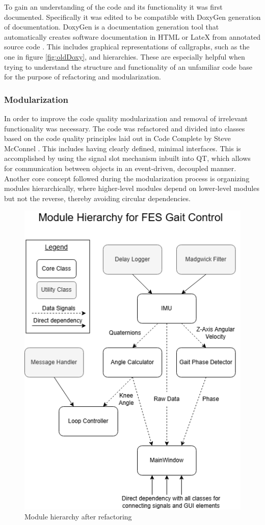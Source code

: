 To gain an understanding of the code and its functionality it was first documented. Specifically it was edited to be compatible with DoxyGen generation of documentation. DoxyGen is a documentation generation tool that automatically creates software documentation in HTML or LateX from annotated source code . This includes graphical representations of callgraphs, such as the one in figure \ref{fig:oldDoxy}, and hierarchies. These are especially helpful when trying to understand the structure and functionality of an unfamiliar code base for the purpose of refactoring and modularization.  


\subsubsection{Modularization}

In order to improve the code quality modularization and removal of irrelevant functionality was necessary. The code was refactored and divided into classes based on the code quality principles laid out in Code Complete by Steve McConnel \cite{steve_mcconnell_code_nodate}. This includes having clearly defined, minimal interfaces. This is accomplished by using the signal slot mechanism inbuilt into QT, which allows for communication between objects in an event-driven, decoupled manner. Another core concept followed during the modularization process is organizing modules hierarchically, where higher-level modules depend on lower-level modules but not the reverse, thereby avoiding circular dependencies. 

\begin{figure} [h]
    \centering
    \includegraphics[width=0.6\linewidth]{images/gaitcontrol.png}
    \caption{Module hierarchy after refactoring}
    \label{fig:modulehier}
\end{figure}

